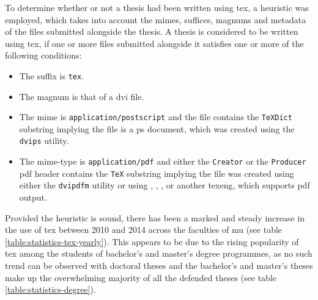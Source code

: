   To determine whether or not a thesis had been written using \gls{tex}, a heuristic was employed, which takes into account the \glspl{mime}, suffices, \glspl{magnum} and metadata of the files submitted alongside the thesis. A thesis is considered to be written using \gls{tex}, if one or more files submitted alongside it satisfies one or more of the following conditions:

  \begin{itemize}
    \item The suffix is \texttt{tex}.
    \item The \gls{magnum} is that of a \acrshort{dvi} file.
    \item The \gls{mime} is \texttt{application/postscript} and the file contains the \texttt{TeXDict} substring implying the file is a \gls{ps} document, which was created using the \texttt{dvips} utility.
    \item The mime-type is \texttt{application/pdf} and either the \texttt{Creator} or the \texttt{Producer} \gls{pdf} header contains the \texttt{TeX} substring implying the file was created using either the \texttt{dvipdfm} utility or using , , ,  or another \gls{texeng}, which supports \gls{pdf} output.
  \end{itemize}

  Provided the heuristic is sound, there has been a marked and steady increase in the use of \gls{tex} between 2010 and 2014 across the faculties of \gls{mu} (see table \ref{table:statistics-tex-yearly}). This appears to be due to the rising popularity of \gls{tex} among the students of bachelor's and master's degree programmes, as no such trend can be observed with doctoral theses and the bachelor's and master's theses make up the overwhelming majority of all the defended theses (see table \ref{table:statistics-degree}).

